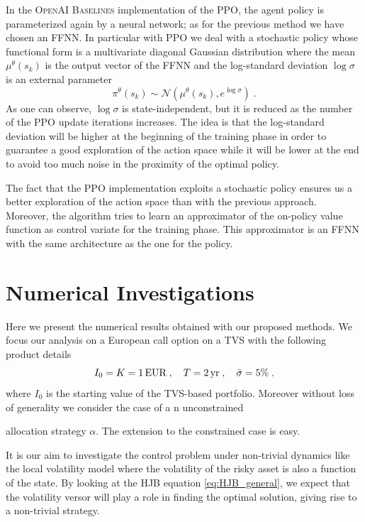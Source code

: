 \documentclass[runningheads]{m2ef}
\newcommand\soutpars[1]{\let\helpcmd\sout\parhelp#1\par\relax\relax}
\newcommand{\change}[1]{{\color{red} {#1}}}%
\newcommand{\remove}[1]{{\color{red} \soutpars{{#1}}}}%
\begin{document}
In the \textsc{OpenAI Baselines} implementation of the PPO, the agent policy is parameterized again by a neural network; as for the previous method we have chosen an FFNN. In particular with PPO we deal with a stochastic policy whose functional form is a multivariate diagonal Gaussian distribution where the mean $\mu^\theta(s_k)$ is the output vector of the FFNN and the log-standard deviation $\log\sigma$ is an external parameter
\begin{equation}
	\pi^\theta(s_k) \sim \mathcal{N}(\mu^\theta(s_k),e^{\log\sigma}) \; .
\end{equation}
As one can observe, $\log\sigma$ is state-independent, but it is reduced as the number of the PPO update iterations increases. The idea is that the log-standard deviation will be higher at the beginning of the training phase in order to guarantee a good exploration of the action space while it will be lower at the end to avoid too much noise in the proximity of the optimal policy.

The fact that the PPO implementation exploits a stochastic policy ensures us a better exploration of the action space than with the previous approach. Moreover, the algorithm tries to learn an approximator of the on-policy value function as control variate for the training phase. This approximator is an FFNN with the same architecture as the one for the policy.


\section{Numerical \change{I}nvestigations}\label{sec:Numerical_investigations}
Here we present the numerical results obtained with our proposed methods. We focus our analysis on a European call option on a TVS with the following product details
\begin{equation}\nonumber
	I_0 = K = 1 \, \text{EUR} \; , \quad T=2 \, \text{yr} \; , \quad \bar{\sigma} = 5\% \; \change{,}
\end{equation}
\change{where $I_0$ is the starting value of the TVS-based portfolio.}
Moreover without loss of generality we consider the case of a\change{n unconstrained} \remove{completely free} allocation strategy $\alpha$. The extension to the constrained case is easy.

It is our aim to investigate the control problem under non-trivial dynamics like the local volatility model where the volatility of the risky asset is also a function of the state. By looking at the HJB equation \eqref{eq:HJB_general}, we expect that the volatility versor will play a role in finding the optimal solution, giving rise to a non-trivial strategy.
\end{document}

